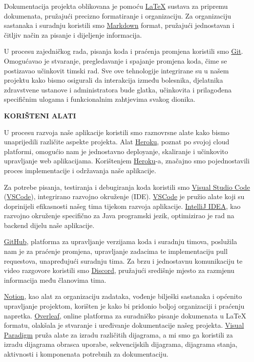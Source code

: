 Dokumentacija projekta oblikovana je pomoću \href{https://www.overleaf.com/learn/latex/Learn_LaTeX_in_30_minutes}{LaTeX} sustava za pripremu dokumenata, pružajući precizno formatiranje i organizaciju. Za organizaciju sastanaka i suradnju koristili smo \href{https://www.markdownguide.org}{Markdown} format, pružajući jednostavan i čitljiv način za pisanje i dijeljenje informacija.

U procesu zajedničkog rada, pisanja koda i praćenja promjena koristili smo \href{https://git-scm.com/}{Git}. Omogućavao je stvaranje, pregledavanje i spajanje promjena koda, čime se postizavao učinkovit timski rad. Sve ove tehnologije integrirane su u našem projektu kako bismo osigurali da interakcija između bolesnika, djelatnika zdravstvene ustanove i administratora bude glatka, učinkovita i prilagođena specifičnim ulogama i funkcionalnim zahtjevima svakog dionika.



\textbf{KORIŠTENI ALATI
}

U procesu razvoja naše aplikacije koristili smo raznovrsne alate kako bismo unaprijedili različite aspekte projekta. Alat \href{https://www.heroku.com}{Heroku}, poznat po svojoj cloud platformi, omogućio nam je jednostavno deployanje, skaliranje i učinkovito upravljanje web aplikacijama. Korištenjem \href{https://www.heroku.com}{Heroku}-a, značajno smo pojednostavili proces implementacije i održavanja naše aplikacije.

Za potrebe pisanja, testiranja i debugiranja koda koristili smo \href{https://www.visualstudio.com}{Visual Studio Code} (\href{https://www.visualstudio.com}{VSCode}), integrirano razvojno okruženje (IDE). \href{https://www.visualstudio.com}{VSCode} je pružio alate koji su doprinijeli efikasnosti našeg tima tijekom razvoja aplikacije. \href{https://www.jetbrains.com/idea}{IntelliJ IDEA}, kao razvojno okruženje specifično za Java programski jezik, optimizirao je rad na backend dijelu naše aplikacije. 

\href{https://github.com}{GitHub}, platforma za upravljanje verzijama koda i suradnju timova, poslužila nam je za praćenje promjena, upravljanje zadacima te implementaciju pull requestova, unapređujući suradnju tima. Za brzu i jednostavnu komunikaciju te video razgovore koristili smo \href{https://discord.com}{Discord}, pružajući središnje mjesto za razmjenu informacija među članovima tima.


\href{https://www.notion.so}{Notion}, kao alat za organizaciju zadataka, vođenje bilješki sastanaka i općenito upravljanje projektom, korišten je kako bi pridonio boljoj organizaciji i praćenju napretka. \href{https://www.overleaf.com}{Overleaf}, online platforma za suradničko pisanje dokumenata u LaTeX formatu, olakšala je stvaranje i uređivanje dokumentacije našeg projekta.
\href{https://www.visual-paradigm.com}{Visual Paradigm} pruža alate za izradu različitih dijagrama, a mi smo ga koristili za izradu dijagrama obrasca uporabe, sekvencijskih dijagrama, dijagrama stanja, aktivnosti i komponenata potrebnih za dokumentaciju. 

